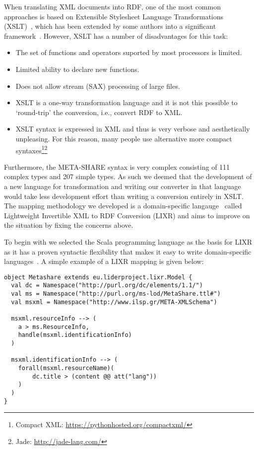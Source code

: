 \documentclass{llncs}
\begin{document}
When translating XML documents into RDF, one of the most common approaches is
based on Extensible Stylesheet Language Transformations
(XSLT)~\cite{wustner2002converting,van2008xml,borin2014representing}, which has
been extended by some authors into a significant
framework~\cite{lange2009krextor}. However, XSLT has a number of disadvantages
for this task:

\begin{itemize}
    \item The set of functions and operators suported by most processors is
        limited.
    \item Limited ability to declare new functions.
    \item Does not allow stream (SAX) processing of large files.
    \item XSLT is a one-way transformation language and it is not this possible
        to `round-trip' the conversion, i.e., convert RDF to XML.
    \item XSLT syntax is expressed in XML and thus is very verbose and
        aesthetically unpleasing. For this reason, many people use alternative
        more compact syntaxes\footnote{Compact XML:
        \url{https://pythonhosted.org/compactxml/}}\footnote{Jade:
        \url{http://jade-lang.com/}}
\end{itemize}

Furthermore, the META-SHARE syntax is very complex consisting of 111 complex
types and 207 simple types. As such we deemed that the development of a new
language for transformation and writing our converter in that language would
take less development effort than writing a conversion entirely in XSLT. The
mapping methodology we developed is a domain-specific
langauge~\cite{fowler2010domain} called Lightweight Invertible XML to RDF
Conversion (LIXR) and aims to improve on the situation by fixing the concerns
above. 

To begin with we selected the Scala programming language as the basis for LIXR
as it has a proven syntactic flexibility that makes it easy to write
domain-specific languages~\cite{wampler2008programming}. A simple example of a
LIXR mapping is given below:

{\footnotesize
\begin{verbatim}
object Metashare extends eu.liderproject.lixr.Model {
  val dc = Namespace("http://purl.org/dc/elements/1.1/")
  val ms = Namespace("http://purl.org/ms-lod/MetaShare.ttl#")
  val msxml = Namespace("http://www.ilsp.gr/META-XMLSchema")

  msxml.resourceInfo --> (
    a > ms.ResourceInfo,
    handle(msxml.identificationInfo)
  )

  msxml.identificationInfo --> (
    forall(msxml.resourceName)(
        dc.title > (content @@ att("lang"))
    )
  )
}
\end{verbatim}}
\end{document}
